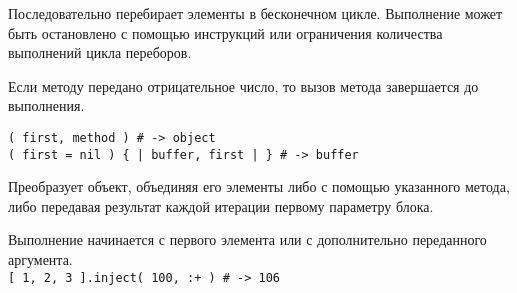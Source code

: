 \begin{methodlist}
  Последовательно перебирает элементы в бесконечном цикле. Выполнение может быть остановлено с помощью инструкций или ограничения количества выполнений цикла переборов.

  Если методу передано отрицательное число, то вызов метода завершается до выполнения.

  \verb!( first, method ) # -> object!
  \\\verb!( first = nil ) { | buffer, first | } # -> buffer!

  Преобразует объект, объединяя его элементы либо с помощью указанного метода, либо передавая результат каждой итерации первому параметру блока.

  Выполнение начинается с первого элемента или с дополнительно переданного аргумента. 
  \\\verb![ 1, 2, 3 ].inject( 100, :+ ) # -> 106!
\end{methodlist} 